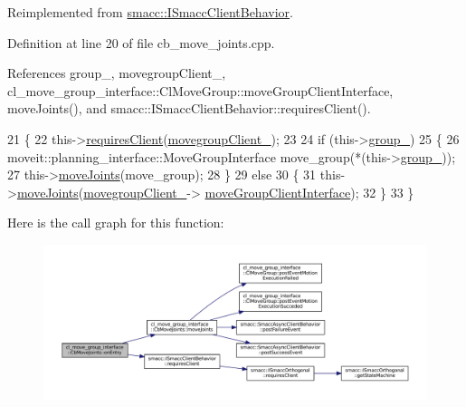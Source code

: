 Reimplemented from \hyperlink{classsmacc_1_1ISmaccClientBehavior_a3ec24a839087c550e1d62a81e48cf530}{smacc\+::\+I\+Smacc\+Client\+Behavior}.



Definition at line 20 of file cb\+\_\+move\+\_\+joints.\+cpp.



References group\+\_\+, movegroup\+Client\+\_\+, cl\+\_\+move\+\_\+group\+\_\+interface\+::\+Cl\+Move\+Group\+::move\+Group\+Client\+Interface, move\+Joints(), and smacc\+::\+I\+Smacc\+Client\+Behavior\+::requires\+Client().


\begin{DoxyCode}
21   \{
22     this->\hyperlink{classsmacc_1_1ISmaccClientBehavior_a32b16e99e3b4cb289414203dc861a440}{requiresClient}(\hyperlink{classcl__move__group__interface_1_1CbMoveJoints_aa5749bbc6bb5f09069e9e8115326f024}{movegroupClient\_});
23 
24     \textcolor{keywordflow}{if} (this->\hyperlink{classcl__move__group__interface_1_1CbMoveJoints_afc75b1e5403e49583930531bcb6508eb}{group\_})
25     \{
26       moveit::planning\_interface::MoveGroupInterface move\_group(*(this->\hyperlink{classcl__move__group__interface_1_1CbMoveJoints_afc75b1e5403e49583930531bcb6508eb}{group\_}));
27       this->\hyperlink{classcl__move__group__interface_1_1CbMoveJoints_ad91d243eb8a818e240d85e5a7fdea68d}{moveJoints}(move\_group);
28     \}
29     \textcolor{keywordflow}{else}
30     \{
31       this->\hyperlink{classcl__move__group__interface_1_1CbMoveJoints_ad91d243eb8a818e240d85e5a7fdea68d}{moveJoints}(\hyperlink{classcl__move__group__interface_1_1CbMoveJoints_aa5749bbc6bb5f09069e9e8115326f024}{movegroupClient\_}->
      \hyperlink{classcl__move__group__interface_1_1ClMoveGroup_a92922ea689e4e1b7b91512c56629c95b}{moveGroupClientInterface});
32     \}
33   \}
\end{DoxyCode}
Here is the call graph for this function\+:
\nopagebreak
\begin{figure}[H]
\begin{center}
\leavevmode
\includegraphics[width=350pt]{classcl__move__group__interface_1_1CbMoveJoints_a23e4181af695aed9fa6bb4ae3f17fd76_cgraph}
\end{center}
\end{figure}
\mbox{\label{classcl__move__group__interface_1_1CbMoveJoints_aff7d27d2427a5a771cb9abce1609aa27}} 
